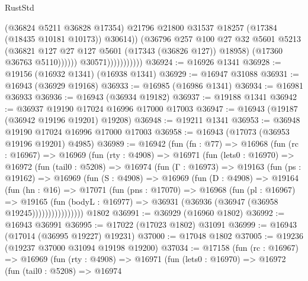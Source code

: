\begin{lexlean}{RustStd}
\begin{coremodule}
                                      (@36824 @5211 @36828 @17354)
                                      @21796
                                      @21800
                                      @31537
                                      @18257
                                      (@17384 (@18435 @10181 @10173))
                                      @30614))
                                  (@36796
                                    @257
                                    @100
                                    @27
                                    @32
                                    @5601
                                    @5213
                                    (@36821 @127 @27 @127 @5601 (@17343 (@36826 @127)) @18958)
                                    (@17360 @36763 @5110))))))
                          @30571)))))))))))
@36924 := @16926 @1341
@36928 := @19156 (@16932 @1341) (@16938 @1341)
@36929 := @16947 @31088
@36931 := @16943 (@36929 @19168)
@36933 := @16985 (@16986 @1341)
@36934 := @16981 @36933
@36936 := @16943 (@36934 @19182)
@36937 := @19188 @1341
@36942 := @36937 @19190 @17024 @16996 @17000 @17003
@36947 := @16943 (@19187 (@36942 @19196 @19201) @19208)
@36948 := @19211 @1341
@36953 := @36948 @19190 @17024 @16996 @17000 @17003
@36958 := @16943 (@17073 (@36953 @19196 @19201) @4985)
@36989 := @16942
    (fun (fn : @77) =>
    @16968
      (fun (rc : @16967) =>
      @16969
        (fun (rty : @4908) =>
        @16971
          (fun (lets0 : @16970) =>
          @16972
            (fun (tail0 : @5208) =>
            @16974
              (fun (Γ : @16973) =>
              @19163
                (fun (ps : @19162) =>
                @16969
                  (fun (S : @4908) =>
                  @16969
                    (fun (D : @4908) =>
                    @19164
                      (fun (hn : @16) =>
                      @17071
                        (fun (pns : @17070) =>
                        @16968
                          (fun (pl : @16967) =>
                          @19165
                            (fun (bodyL : @16977) =>
                            @36931 (@36936 (@36947 (@36958 @19245))))))))))))))))
    @1802
@36991 := @36929 (@16960 @1802)
@36992 := @16943 @36991
@36995 := @17022 (@17023 @1802) @31091
@36999 := @16943 (@17014 (@36995 @19227) @19231)
@37000 := @17048 @1802
@37005 := @19236 (@19237 @37000 @31094 @19198 @19200)
@37034 := @17158
    (fun (rc : @16967) =>
    @16969
      (fun (rty : @4908) =>
      @16971
        (fun (lets0 : @16970) =>
        @16972
          (fun (tail0 : @5208) =>
          @16974

\end{coremodule}
\end{lexlean}
